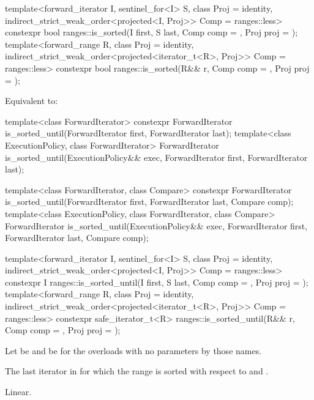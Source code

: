 %
\begin{itemdecl}
template<forward_iterator I, sentinel_for<I> S, class Proj = identity,
         indirect_strict_weak_order<projected<I, Proj>> Comp = ranges::less>
  constexpr bool ranges::is_sorted(I first, S last, Comp comp = {}, Proj proj = {});
template<forward_range R, class Proj = identity,
         indirect_strict_weak_order<projected<iterator_t<R>, Proj>> Comp = ranges::less>
  constexpr bool ranges::is_sorted(R&& r, Comp comp = {}, Proj proj = {});
\end{itemdecl}

\begin{itemdescr}
\pnum
\effects
Equivalent to:
\end{itemdescr}

%
\begin{itemdecl}
template<class ForwardIterator>
  constexpr ForwardIterator
    is_sorted_until(ForwardIterator first, ForwardIterator last);
template<class ExecutionPolicy, class ForwardIterator>
  ForwardIterator
    is_sorted_until(ExecutionPolicy&& exec,
                    ForwardIterator first, ForwardIterator last);

template<class ForwardIterator, class Compare>
  constexpr ForwardIterator
    is_sorted_until(ForwardIterator first, ForwardIterator last,
                    Compare comp);
template<class ExecutionPolicy, class ForwardIterator, class Compare>
  ForwardIterator
    is_sorted_until(ExecutionPolicy&& exec,
                    ForwardIterator first, ForwardIterator last,
                    Compare comp);

template<forward_iterator I, sentinel_for<I> S, class Proj = identity,
         indirect_strict_weak_order<projected<I, Proj>> Comp = ranges::less>
  constexpr I ranges::is_sorted_until(I first, S last, Comp comp = {}, Proj proj = {});
template<forward_range R, class Proj = identity,
         indirect_strict_weak_order<projected<iterator_t<R>, Proj>> Comp = ranges::less>
  constexpr safe_iterator_t<R>
    ranges::is_sorted_until(R&& r, Comp comp = {}, Proj proj = {});
\end{itemdecl}

\begin{itemdescr}
\pnum
Let  be 
and  be 
for the overloads with no parameters by those names.

\pnum
\returns
The last iterator  in 
for which the range 
is sorted with respect to  and .

\pnum
\complexity
Linear.
\end{itemdescr}

